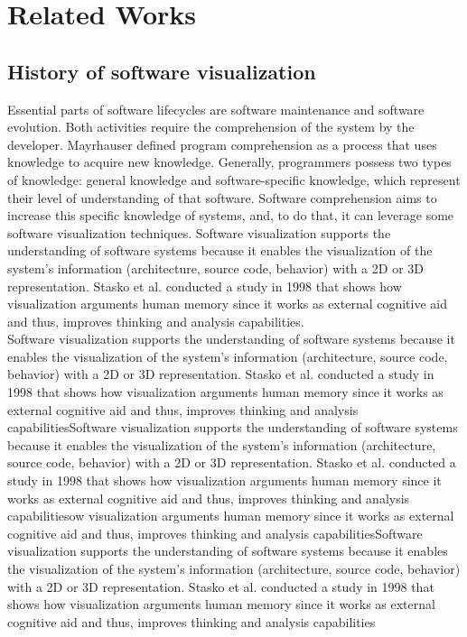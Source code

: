 
\chapter[Related Works]{Related Works}
\graphicspath{ {images/stateOfArt} }

\section{History of software visualization}

Essential parts of software lifecycles are software maintenance and software evolution. Both activities require the comprehension of the system by the developer. Mayrhauser \cite{VonMayrhauser1995} defined program comprehension as a process that uses knowledge to acquire new knowledge. Generally, programmers possess two types of knowledge: general knowledge and software-specific knowledge, which represent their level of understanding of that software. Software comprehension aims to increase this specific knowledge of systems, and, to do that, it can leverage some software visualization techniques. Software visualization supports the understanding of software systems because it enables the visualization of the system's information (architecture, source code, behavior) with a 2D or 3D representation. Stasko et al.\cite{Stasko2008} conducted a study in 1998 that shows how visualization arguments human memory since it works as external cognitive aid and thus, improves thinking and analysis capabilities. \\

Software visualization supports the understanding of software systems because it enables the visualization of the system's information (architecture, source code, behavior) with a 2D or 3D representation. Stasko et al.\cite{Stasko2008} conducted a study in 1998 that shows how visualization arguments human memory since it works as external cognitive aid and thus, improves thinking and analysis capabilitiesSoftware visualization supports the understanding of software systems because it enables the visualization of the system's information (architecture, source code, behavior) with a 2D or 3D representation. Stasko et al.\cite{Stasko2008} conducted a study in 1998 that shows how visualization arguments human memory since it works as external cognitive aid and thus, improves thinking and analysis capabilitiesow visualization arguments human memory since it works as external cognitive aid and thus, improves thinking and analysis capabilitiesSoftware visualization supports the understanding of software systems because it enables the visualization of the system's information (architecture, source code, behavior) with a 2D or 3D representation. Stasko et al.\cite{Stasko2008} conducted a study in 1998 that shows how visualization arguments human memory since it works as external cognitive aid and thus, improves thinking and analysis capabilities


